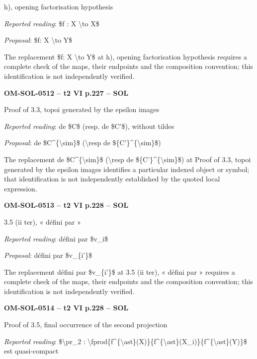 h), opening factorisation hypothesis\par
\emph{Reported reading}: \$f : X \textbackslash{}to X\$\par
\emph{Proposal}: \$f: X \textbackslash{}to Y\$\par
The replacement \$f: X \textbackslash{}to Y\$ at h), opening factorisation hypothesis requires a complete check of the maps, their endpoints and the composition convention; this identification is not independently verified.\par
\par\noindent\textbf{OM-SOL-0512 -- t2 VI p.227 -- SOL}\par
Proof of 3.3, topoi generated by the epsilon images\par
\emph{Reported reading}: de \$C\$ (resp. de \$C'\$), without tildes\par
\emph{Proposal}: de \$C\textasciicircum{}\{\textbackslash{}sim\}\$ (\textbackslash{}resp de \$\{C'\}\textasciicircum{}\{\textbackslash{}sim\}\$)\par
The replacement de \$C\textasciicircum{}\{\textbackslash{}sim\}\$ (\textbackslash{}resp de \$\{C'\}\textasciicircum{}\{\textbackslash{}sim\}\$) at Proof of 3.3, topoi generated by the epsilon images identifies a particular indexed object or symbol; that identification is not independently established by the quoted local expression.\par
\par\noindent\textbf{OM-SOL-0513 -- t2 VI p.228 -- SOL}\par
3.5 (ii ter), « défini par »\par
\emph{Reported reading}: défini par \$v\_i\$\par
\emph{Proposal}: défini par \$v\_\{i'\}\$\par
The replacement défini par \$v\_\{i'\}\$ at 3.5 (ii ter), « défini par » requires a complete check of the maps, their endpoints and the composition convention; this identification is not independently verified.\par
\par\noindent\textbf{OM-SOL-0514 -- t2 VI p.228 -- SOL}\par
Proof of 3.5, final occurrence of the second projection\par
\emph{Reported reading}: \$\textbackslash{}pr\_2 : \textbackslash{}fprod\{f\textasciicircum{}\{\textbackslash{}ast\}(X)\}\{f\textasciicircum{}\{\textbackslash{}ast\}(X\_i)\}\{f\textasciicircum{}\{\textbackslash{}ast\}(Y)\}\$ est quasi-compact\par
